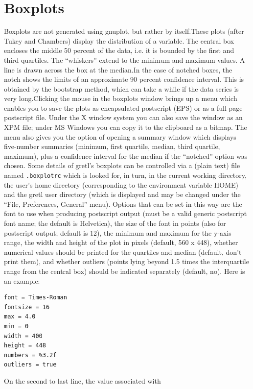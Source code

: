 \section{Boxplots}
\label{sect-boxplots}

Boxplots are not generated using gnuplot, but rather by
	 itself.These plots (after Tukey and Chambers) display the
	distribution of a variable. The central box encloses the
	middle 50 percent of the data, i.e. it is bounded by the first
	and third quartiles.  The ``whiskers'' extend to
	the minimum and maximum values.  A line is drawn across the
	box at the median.In the case of notched boxes, the notch shows the limits
	of an approximate 90 percent confidence interval.  This is
	obtained by the bootstrap method, which can take a while if
	the data series is very long.Clicking the mouse in the boxplots window brings up a menu
	which enables you to save the plots as encapsulated postscript
	(EPS) or as a full-page postscript file.  Under the X window
	system you can also save the window as an XPM file; under MS
	Windows you can copy it to the clipboard as a bitmap.  The
	menu also gives you the option of opening a summary window
	which displays five-number summaries (minimum, first quartile,
	median, third quartile, maximum), plus a confidence interval
	for the median if the ``notched'' option was
	chosen.
      Some details of gretl's boxplots can be controlled via a
	(plain text) file named \verb+.boxplotrc+ which
	is looked for, in turn, in the current working directory, the
	user's home directory (corresponding to the environment
	variable HOME) and the gretl user directory
	(which is displayed and may be changed under the ``File,
	  Preferences, General'' menu).  Options that can be set
	in this way are the font to use when producing postscript
	output (must be a valid generic postscript font name; the
	default is Helvetica), the size of the font in points (also
	for postscript output; default is 12), the minimum and maximum
	for the y-axis range, the width and height of the plot in
	pixels (default, 560 x 448), whether numerical values should
	be printed for the quartiles and median (default, don't print
	them), and whether outliers (points lying beyond 1.5 times the
	interquartile range from the central box) should be indicated
	separately (default, no).  Here is an example:
\begin{verbatim}
font = Times-Roman
fontsize = 16
max = 4.0
min = 0
width = 400
height = 448
numbers = %3.2f
outliers = true
      \end{verbatim}
On the second to last line, the value associated with
